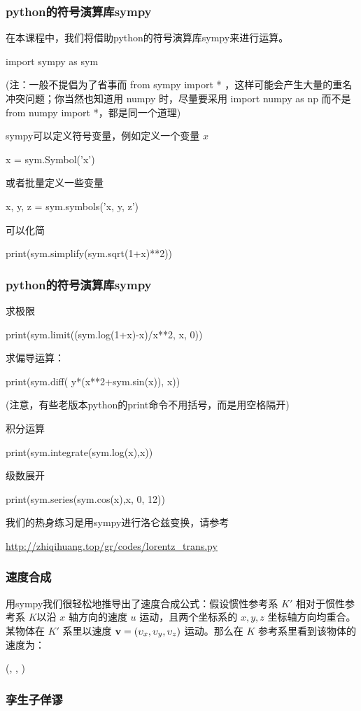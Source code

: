 \documentclass[CJK,13pt]{beamer}
\begin{document}
\begin{frame}
  \frametitle{python的符号演算库sympy}
  在本课程中，我们将借助python的符号演算库sympy来进行运算。

  {\darkgreen import sympy as sym}

  {\scriptsize (注：一般不提倡为了省事而 from sympy import * ，这样可能会产生大量的重名冲突问题；你当然也知道用 numpy 时，尽量要采用 import numpy as np 而不是 from numpy import *，都是同一个道理)}

  \skiplines

  sympy可以定义符号变量，例如定义一个变量 $x$

 {\darkgreen x = sym.Symbol('x')}

  \skipline

  或者批量定义一些变量

  {\darkgreen x, y, z = sym.symbols('x, y, z')}

  \skipline
  
  可以化简

  {\darkgreen print(sym.simplify(sym.sqrt(1+x)**2))}
  

\end{frame}

\begin{frame}
  \frametitle{python的符号演算库sympy}
  求极限
  
  {\darkgreen print(sym.limit((sym.log(1+x)-x)/x**2, x, 0))}

  \skipline
  
  求偏导运算：

 {\darkgreen print(sym.diff( y*(x**2+sym.sin(x)), x))}

  {\scriptsize (注意，有些老版本python的print命令不用括号，而是用空格隔开)}

  \skipline

  积分运算

  {\darkgreen  print(sym.integrate(sym.log(x),x))}

  \skipline

  级数展开
  
  {\darkgreen print(sym.series(sym.cos(x),x, 0, 12))}


  \skipline
  
  我们的热身练习是用sympy进行洛仑兹变换，请参考

  \url{http://zhiqihuang.top/gr/codes/lorentz_trans.py}
\end{frame}

\begin{frame}
  \frametitle{速度合成}
  用sympy我们很轻松地推导出了速度合成公式：假设惯性参考系 $K'$ 相对于惯性参考系 $K$以沿 $x$ 轴方向的速度 $u$ 运动，且两个坐标系的 $x,y,z$ 坐标轴方向均重合。某物体在 $K'$ 系里以速度 ${\mathbf{v}} = (\upsilon_x,\upsilon_y, \upsilon_z)$ 运动。那么在 $K$ 参考系里看到该物体的速度为：

  {\blue
    \be
    (, , )
    \ee
    }
  
\end{frame}


\begin{frame}
  \frametitle{孪生子佯谬}
\end{frame}


\ech
\end{document}
